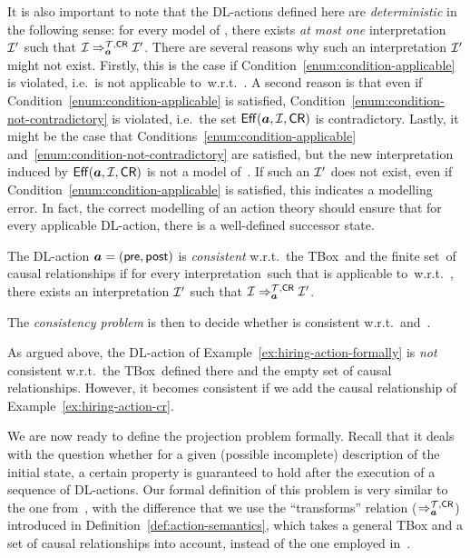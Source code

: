 \noindent
It is also important to note that the DL-actions defined here are
\emph{deterministic} in the following sense: for every model \Imc of \Tmc, there
exists \emph{at most one} interpretation~$\mathcal{I}'$ such that
$\mathcal{I}\Rightarrow_{\boldsymbol a}^{\mathcal{T},\mathsf{CR}}\mathcal{I}'$.  There are several reasons why such an
interpretation $\mathcal{I}'$ might not exist.  Firstly, this is the case if
Condition~\ref{enum:condition-applicable} is violated, i.e.~\abf is not
applicable to~\Imc w.r.t.~\Tmc.  A second reason is that even if
Condition~\ref{enum:condition-applicable} is satisfied,
Condition~\ref{enum:condition-not-contradictory} is violated, i.e.~the set
$\operatorname{\mathsf{Eff}}(\boldsymbol a,\mathcal{I},\mathsf{CR})$ is contradictory.  Lastly, it might be the case that
Conditions~\ref{enum:condition-applicable}
and~\ref{enum:condition-not-contradictory} are satisfied, but the new
interpretation induced by $\operatorname{\mathsf{Eff}}(\boldsymbol a,\mathcal{I},\mathsf{CR})$ is not a model of~\Tmc.  If such
an $\mathcal{I}'$ does not exist, even if Condition~\ref{enum:condition-applicable} is
satisfied, this indicates a modelling error.  In fact, the correct modelling of
an action theory should ensure that for every applicable DL-action, there is a
well-defined successor state.

\begin{definition}\label{def:consistency}
    The DL-action $\boldsymbol a=(\mathsf{pre},\mathsf{post})$ is \emph{consistent} w.r.t.\
    the TBox~\Tmc and the finite set~\CR of causal relationships if for every
    interpretation~\Imc such that \abf is applicable to~\Imc w.r.t.~\Tmc, there
    exists an interpretation $\mathcal{I}'$ such that
    $\mathcal{I}\Rightarrow_{\boldsymbol a}^{\mathcal{T},\mathsf{CR}}\mathcal{I}'$.

    The \emph{consistency problem} is then to decide whether \abf is consistent
    w.r.t.~\Tmc and~\CR.
\end{definition}

\noindent
As argued above, the DL-action \HireJohn of
Example~\ref{ex:hiring-action-formally} is \emph{not} consistent w.r.t.\ the
TBox~\Tmc defined there and the empty set of causal relationships.  However, it
becomes consistent if we add the causal relationship of
Example~\ref{ex:hiring-action-cr}.

We are now ready to define the projection problem formally.  Recall that it
deals with the question whether for a given (possible incomplete) description of
the initial state, a certain property is guaranteed to hold after the execution
of a sequence of DL-actions.
%
Our formal definition of this problem is very similar to the one
from~\cite{BLM+-AAAI05}, with the difference that we use the
\enquote{transforms} relation ($\Rightarrow_{\boldsymbol a}^{\mathcal{T},\mathsf{CR}}$) introduced in
Definition~\ref{def:action-semantics}, which takes a general TBox and a set of
causal relationships into account, instead of the one employed
in~\cite{BLM+-AAAI05}.

